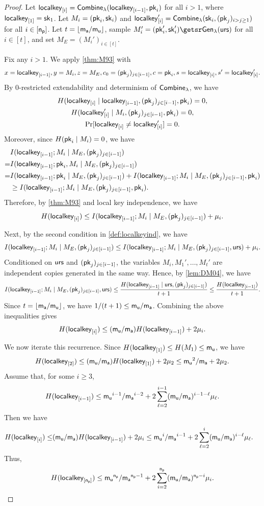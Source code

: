 \begin{proof}
Let $\mathsf{localkey}_{[i]}=\mathsf{Combine}_{\lambda}(\mathsf{localkey}_{[i-1]},\mathsf{pk}_i)$ for all $i>1$, where
$\mathsf{localkey}_{[1]}=\mathsf{sk}_1$. Let $M_i=(\mathsf{pk}_i,\mathsf{sk}_i)$ and
$\mathsf{localkey}_{[i]}'=\mathsf{Combine}_{\lambda}(\mathsf{sk}_i,(\mathsf{pk}_j)_{i>j\geq 1})$ for all $i\in[\mathsf{n_p}]$.
Let $t=\lfloor\mathsf{m_a}/\mathsf{m_u}\rfloor$, sample
$M_i'=(\pk_i',\sk_i')\getsr\gen(\urs)$ for all $i\in[t]$, and set
$M_E=(M_i')_{i\in[t]}$.

Fix any $i>1$. We apply \cref{thm:M93} with
\[
x=\mathsf{localkey}_{[i-1]},
y=M_i,
z=M_E,
c_0=(\mathsf{pk}_j)_{j\in[i-1]},
c=\mathsf{pk}_i,s=\mathsf{localkey}_{[i]},s'=\mathsf{localkey}_{[i]}'.
\]
By $0$-restricted extendability and determinism of $\mathsf{Combine}_{\lambda}$, we have
\[
\begin{gathered}
H(\mathsf{localkey}_{[i]}\mid \mathsf{localkey}_{[i-1]},(\mathsf{pk}_j)_{j\in[i-1]},\mathsf{pk}_i)=0,\\
H(\mathsf{localkey}_{[i]}'\mid M_i,(\mathsf{pk}_j)_{j\in[i-1]},\mathsf{pk}_i)=0,\\
\Pr[\mathsf{localkey}_{[i]}\neq \mathsf{localkey}_{[i]}']=0.
\end{gathered}
\]
Moreover, since $H(\mathsf{pk}_i\mid M_i)=0$, we have
\[
\begin{aligned}
&I(\mathsf{localkey}_{[i-1]};M_i\mid M_E,(\mathsf{pk}_j)_{j\in[i-1]})\\
=&
I(\mathsf{localkey}_{[i-1]};\mathsf{pk}_i,M_i\mid M_E,(\mathsf{pk}_j)_{j\in[i-1]})\\
=&
I(\mathsf{localkey}_{[i-1]};\mathsf{pk}_i\mid M_E,(\mathsf{pk}_j)_{j\in[i-1]})+
I(\mathsf{localkey}_{[i-1]};M_i\mid M_E,(\mathsf{pk}_j)_{j\in[i-1]},\mathsf{pk}_i)\\
&\geq
I(\mathsf{localkey}_{[i-1]};M_i\mid M_E,(\mathsf{pk}_j)_{j\in[i-1]},\mathsf{pk}_i).
\end{aligned}
\]
Therefore, by \cref{thm:M93} and local key independence, we have
\[
H(\mathsf{localkey}_{[i]})
\leq
I(\mathsf{localkey}_{[i-1]};M_i\mid M_E,(\mathsf{pk}_j)_{j\in[i-1]})+\mu_i.
\]

Next, by the second condition in \cref{def:localkeyind}, we have
\[
I(\mathsf{localkey}_{[i-1]};M_i\mid M_E,(\mathsf{pk}_j)_{j\in[i-1]})
\leq
I(\mathsf{localkey}_{[i-1]};M_i\mid M_E,(\mathsf{pk}_j)_{j\in[i-1]},\mathsf{urs})+\mu_i.
\]
Conditioned on $\mathsf{urs}$ and $(\mathsf{pk}_j)_{j\in[i-1]}$, the variables
$M_i,M_1',\ldots,M_t'$ are independent copies generated in the same way.
Hence, by \cref{lem:DM04}, we have
\[
I(\mathsf{localkey}_{[i-1]};M_i\mid M_E,(\mathsf{pk}_j)_{j\in[i-1]},\mathsf{urs})
\leq
\frac{H(\mathsf{localkey}_{[i-1]}\mid \mathsf{urs},(\mathsf{pk}_j)_{j\in[i-1]})}{t+1}
\leq
\frac{H(\mathsf{localkey}_{[i-1]})}{t+1}.
\]
Since $t=\lfloor\mathsf{m_a}/\mathsf{m_u}\rfloor$, we have $1/(t+1)\leq\mathsf{m_u}/\mathsf{m_a}$.
Combining the above inequalities gives
\[
H(\mathsf{localkey}_{[i]})
\leq
(\mathsf{m_u}/\mathsf{m_a})H(\mathsf{localkey}_{[i-1]})+2\mu_i.
\]

We now iterate this recurrence. Since
$H(\mathsf{localkey}_{[1]})\leq H(M_1)\leq\mathsf{m_u}$, we have
\[
H(\mathsf{localkey}_{[2]})
\leq
(\mathsf{m_u}/\mathsf{m_a})H(\mathsf{localkey}_{[1]})+2\mu_2
\leq
\mathsf{m_u}^2/\mathsf{m_a}+2\mu_2.
\]
Assume that, for some $i\geq3$,
\[
H(\mathsf{localkey}_{[i-1]})
\leq
\mathsf{m_u}^{i-1}/\mathsf{m_a}^{i-2}
+
2\sum_{\ell=2}^{i-1}(\mathsf{m_u}/\mathsf{m_a})^{i-1-\ell}\mu_\ell.
\]
Then we have
\[
\begin{aligned}
H(\mathsf{localkey}_{[i]})
\leq&
(\mathsf{m_u}/\mathsf{m_a})H(\mathsf{localkey}_{[i-1]})+2\mu_i
\leq
\mathsf{m_u}^i/\mathsf{m_a}^{i-1}
+
2\sum_{\ell=2}^{i}(\mathsf{m_u}/\mathsf{m_a})^{i-\ell}\mu_\ell.
\end{aligned}
\]
Thus,
\[
H(\mathsf{localkey}_{[\mathsf{n_p}]})
\leq
\mathsf{m_u}^{\mathsf{n_p}}/\mathsf{m_a}^{\mathsf{n_p}-1}
+
2\sum_{i=2}^{\mathsf{n_p}}(\mathsf{m_u}/\mathsf{m_a})^{\mathsf{n_p}-i}\mu_i.
\]


\end{proof}
